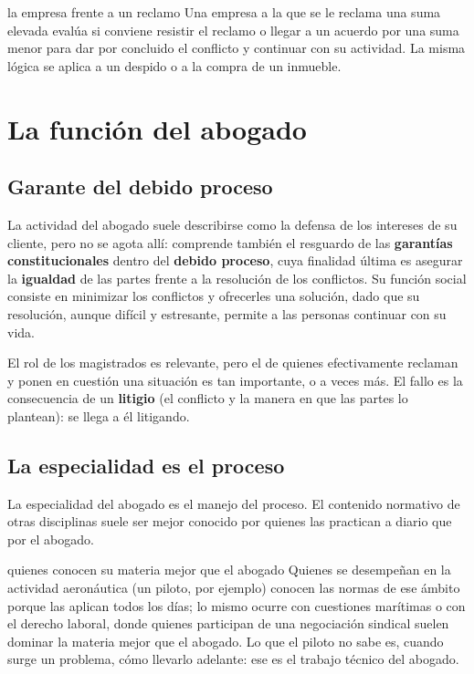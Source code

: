 \documentclass[12pt,oneside]{book}
\begin{document}
\begin{ejemplo}{la empresa frente a un reclamo}
Una empresa a la que se le reclama una suma elevada evalúa si conviene resistir el reclamo o llegar a un acuerdo por una suma menor para dar por concluido el conflicto y continuar con su actividad. La misma lógica se aplica a un despido o a la compra de un inmueble.
\end{ejemplo}

\section{La función del abogado}

\subsection{Garante del debido proceso}

La actividad del abogado suele describirse como la defensa de los intereses de su cliente, pero no se agota allí: comprende también el resguardo de las \textbf{garantías constitucionales} dentro del \textbf{debido proceso}, cuya finalidad última es asegurar la \textbf{igualdad} de las partes frente a la resolución de los conflictos. Su función social consiste en minimizar los conflictos y ofrecerles una solución, dado que su resolución, aunque difícil y estresante, permite a las personas continuar con su vida.

El rol de los magistrados es relevante, pero el de quienes efectivamente reclaman y ponen en cuestión una situación es tan importante, o a veces más. El fallo es la consecuencia de un \textbf{litigio} (el conflicto y la manera en que las partes lo plantean): se llega a él litigando.

\subsection{La especialidad es el proceso}

La especialidad del abogado es el manejo del proceso. El contenido normativo de otras disciplinas suele ser mejor conocido por quienes las practican a diario que por el abogado.

\begin{ejemplo}{quienes conocen su materia mejor que el abogado}
Quienes se desempeñan en la actividad aeronáutica (un piloto, por ejemplo) conocen las normas de ese ámbito porque las aplican todos los días; lo mismo ocurre con cuestiones marítimas o con el derecho laboral, donde quienes participan de una negociación sindical suelen dominar la materia mejor que el abogado. Lo que el piloto no sabe es, cuando surge un problema, cómo llevarlo adelante: ese es el trabajo técnico del abogado.
\end{ejemplo}
\end{document}
